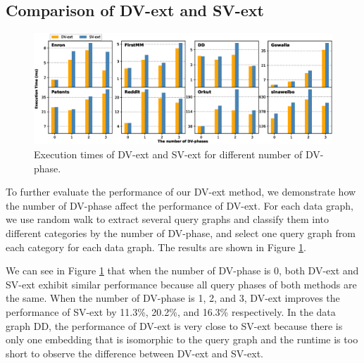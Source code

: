 \subsection{Comparison of DV-ext and SV-ext} \label{sec:comparesv}
\begin{figure}
\centering
\includegraphics[width=\textwidth]{./figure/compareSV.eps}
\caption{Execution times of DV-ext and SV-ext for different number of DV-phase.}	
\label{fig:compareSV}
\end{figure}
To further evaluate the performance of our DV-ext method, we demonstrate how the number of DV-phase affect the performance of DV-ext. For each data graph, we use random walk to extract several query graphs and classify them into different categories by the number of DV-phase, and select one query graph from each category for each data graph. The results are shown in Figure \ref{fig:compareSV}.

We can see in Figure \ref{fig:compareSV} that when the number of DV-phase is 0, both DV-ext and SV-ext exhibit similar performance because all query phases of both methods are the same. When the number of DV-phase is 1, 2, and 3, DV-ext improves the performance of SV-ext by 11.3\%, 20.2\%, and 16.3\% respectively. In the data graph DD, the performance of DV-ext is very close to SV-ext because there is only one embedding that is isomorphic to the query graph and the runtime is too short to observe the difference between DV-ext and SV-ext.